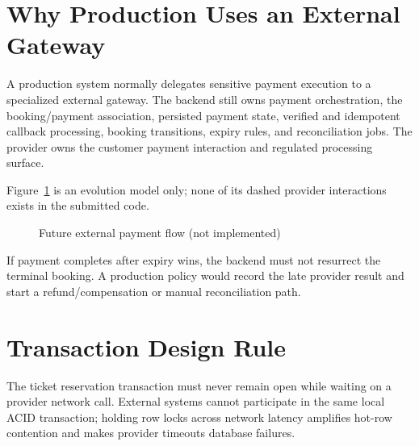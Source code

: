 \section{Why Production Uses an External Gateway}
A production system normally delegates sensitive payment execution to a
specialized external gateway. The backend still owns payment orchestration,
the booking/payment association, persisted payment state, verified and
idempotent callback processing, booking transitions, expiry rules, and
reconciliation jobs. The provider owns the customer payment interaction and
regulated processing surface.

Figure~\ref{fig:future-payment-flow} is an evolution model only; none of its
dashed provider interactions exists in the submitted code.

\begin{figure}[H]
\centering
{}
\caption{Future external payment flow (not implemented)}
\label{fig:future-payment-flow}
\end{figure}

If payment completes after expiry wins, the backend must not resurrect the
terminal booking. A production policy would record the late provider result
and start a refund/compensation or manual reconciliation path.

\section{Transaction Design Rule}
The ticket reservation transaction must never remain open while waiting on a
provider network call. External systems cannot participate in the same local
ACID transaction; holding row locks across network latency amplifies hot-row
contention and makes provider timeouts database failures.

